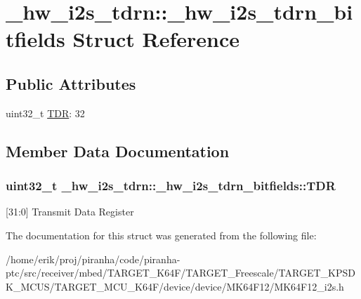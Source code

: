 \hypertarget{struct__hw__i2s__tdrn_1_1__hw__i2s__tdrn__bitfields}{}\section{\+\_\+hw\+\_\+i2s\+\_\+tdrn\+:\+:\+\_\+hw\+\_\+i2s\+\_\+tdrn\+\_\+bitfields Struct Reference}
\label{struct__hw__i2s__tdrn_1_1__hw__i2s__tdrn__bitfields}
\subsection*{Public Attributes}
\begin{DoxyCompactItemize}
\item 
uint32\+\_\+t \hyperlink{struct__hw__i2s__tdrn_1_1__hw__i2s__tdrn__bitfields_a3092798f629e268941f207afc6c68e13}{T\+DR}\+: 32
\end{DoxyCompactItemize}


\subsection{Member Data Documentation}
\subsubsection[{\texorpdfstring{T\+DR}{TDR}}]{\setlength{\rightskip}{0pt plus 5cm}uint32\+\_\+t \+\_\+hw\+\_\+i2s\+\_\+tdrn\+::\+\_\+hw\+\_\+i2s\+\_\+tdrn\+\_\+bitfields\+::\+T\+DR}\hypertarget{struct__hw__i2s__tdrn_1_1__hw__i2s__tdrn__bitfields_a3092798f629e268941f207afc6c68e13}{}\label{struct__hw__i2s__tdrn_1_1__hw__i2s__tdrn__bitfields_a3092798f629e268941f207afc6c68e13}
\mbox{[}31\+:0\mbox{]} Transmit Data Register 

The documentation for this struct was generated from the following file\+:\begin{DoxyCompactItemize}
\item 
/home/erik/proj/piranha/code/piranha-\/ptc/src/receiver/mbed/\+T\+A\+R\+G\+E\+T\+\_\+\+K64\+F/\+T\+A\+R\+G\+E\+T\+\_\+\+Freescale/\+T\+A\+R\+G\+E\+T\+\_\+\+K\+P\+S\+D\+K\+\_\+\+M\+C\+U\+S/\+T\+A\+R\+G\+E\+T\+\_\+\+M\+C\+U\+\_\+\+K64\+F/device/device/\+M\+K64\+F12/M\+K64\+F12\+\_\+i2s.\+h\end{DoxyCompactItemize}

